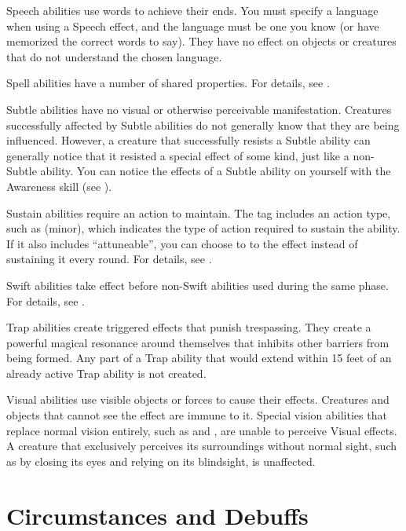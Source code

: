      Speech abilities use words to achieve their ends.
    You must specify a language when using a Speech effect, and the language must be one you know (or have memorized the correct words to say). They have no effect on objects or creatures that do not understand the chosen language.

     Spell abilities have a number of shared properties.
    For details, see .

     Subtle abilities have no visual or otherwise perceivable manifestation.
    Creatures successfully affected by Subtle abilities do not generally know that they are being influenced.
    However, a creature that successfully resists a Subtle ability can generally notice that it resisted a special effect of some kind, just like a non-Subtle ability.
    You can notice the effects of a Subtle ability on yourself with the Awareness skill (see ).

     Sustain abilities require an action to maintain.
    The tag includes an action type, such as (minor), which indicates the type of action required to sustain the ability.
    If it also includes ``attuneable'', you can choose to  to the effect instead of sustaining it every round.
    For details, see .

     Swift abilities take effect before non-Swift abilities used during the same phase.
    For details, see .

     Trap abilities create triggered effects that punish trespassing.
    They create a powerful magical resonance around themselves that inhibits other barriers from being formed.
    Any part of a Trap ability that would extend within 15 feet of an already active Trap ability is not created.

     Visual abilities use visible objects or forces to cause their effects.
    Creatures and objects that cannot see the effect are immune to it.
    Special vision abilities that replace normal vision entirely, such as  and , are unable to perceive Visual effects.
    A creature that exclusively perceives its surroundings without normal sight, such as by closing its eyes and relying on its blindsight, is unaffected.

\newpage
\section{Circumstances and Debuffs}\label{Circumstances and Debuffs}

